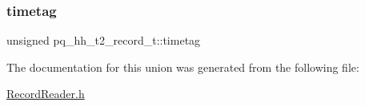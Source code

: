 \subsubsection{\texorpdfstring{timetag}{timetag}}
{\footnotesize\ttfamily unsigned pq\+\_\+hh\+\_\+t2\+\_\+record\+\_\+t\+::timetag}



The documentation for this union was generated from the following file\+:\begin{DoxyCompactItemize}
\item 
\hyperlink{_record_reader_8h}{Record\+Reader.\+h}\end{DoxyCompactItemize}
